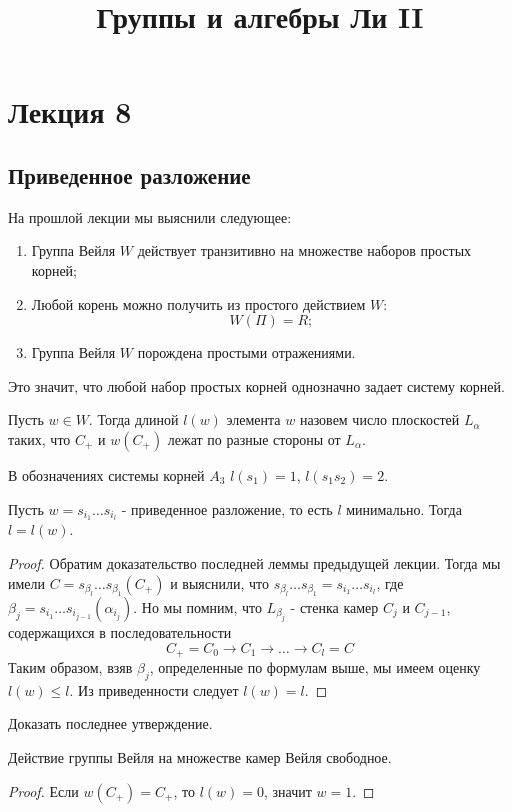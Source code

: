 \documentclass[a4article]{article}
\title{Группы и алгебры Ли II}
\author{}
\date{}
\begin{document}
\maketitle

\section*{Лекция 8}



\subsection*{Приведенное разложение}

На прошлой лекции мы выяснили следующее:
\begin{enumerate}
    \item Группа Вейля $W$ действует транзитивно на множестве наборов простых корней;
    \item Любой корень можно получить из простого действием $W$:
    $$W(\Pi)=R;$$
    \item Группа Вейля $W$ порождена простыми отражениями.
\end{enumerate}

Это значит, что любой набор простых корней однозначно задает систему корней.

\begin{definition}
    Пусть $w \in W$. Тогда длиной $l(w)$ элемента $w$ назовем число плоскостей $L_{\alpha}$ таких, что $C_{+}$ и $w(C_{+})$ лежат по разные стороны от $L_{\alpha}$.
\end{definition}
\begin{example} В обозначениях системы корней $A_3$
    $l(s_1)=1$, $l(s_1s_2)=2$.
\end{example}
\begin{theorem}
    Пусть $w = s_{i_1}\ldots s_{i_l}$ - приведенное разложение, то есть $l$ минимально. Тогда $l=l(w)$.
\end{theorem}
\begin{proof}
    Обратим доказательство последней леммы предыдущей лекции. Тогда мы имели $C=s_{\beta_l}\ldots s_{\beta_1}(C_{+})$ и выяснили, что $s_{\beta_l}\ldots s_{\beta_1} = s_{i_1}\ldots s_{i_l}$, где $\beta_j = s_{i_1}\ldots s_{i_{j-1}}(\alpha_{i_j})$. Но мы помним, что $L_{\beta_j}$ - стенка камер $C_j$ и $C_{j-1}$, содержащихся в последовательности $$C_+ = C_0 \rightarrow C_1 \rightarrow \ldots \rightarrow C_l = C$$
    Таким образом, взяв $\beta_j$, определенные по формулам выше, мы имеем оценку $l(w) \le l$. Из приведенности следует $l(w) = l$.
\end{proof}
\begin{exercise}
    Доказать последнее утверждение.
\end{exercise}
\begin{corollary}
    Действие группы Вейля на множестве камер Вейля свободное.
\end{corollary}
\begin{proof}
    Если $w(C_+)=C_+$, то $l(w)=0$, значит $w=1$.
\end{proof}
\end{document}

